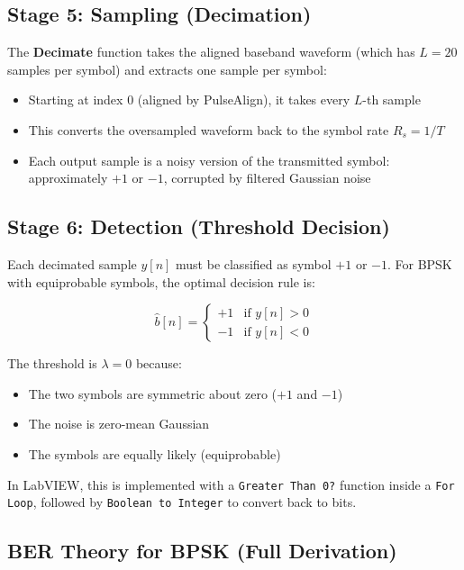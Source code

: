 \subsection{Stage 5: Sampling (Decimation)}

The \textbf{Decimate} function takes the aligned baseband waveform (which has $L = 20$ samples per symbol) and extracts one sample per symbol:

\begin{itemize}
\item Starting at index 0 (aligned by PulseAlign), it takes every $L$-th sample
\item This converts the oversampled waveform back to the symbol rate $R_s = 1/T$
\item Each output sample is a noisy version of the transmitted symbol: approximately $+1$ or $-1$, corrupted by filtered Gaussian noise
\end{itemize}

\subsection{Stage 6: Detection (Threshold Decision)}

Each decimated sample $y[n]$ must be classified as symbol $+1$ or $-1$. For BPSK with equiprobable symbols, the optimal decision rule is:

\begin{equation}
\hat{b}[n] = \begin{cases} +1 & \text{if } y[n] > 0 \\ -1 & \text{if } y[n] < 0 \end{cases}
\end{equation}

The threshold is $\lambda = 0$ because:

\begin{itemize}
\item The two symbols are symmetric about zero ($+1$ and $-1$)
\item The noise is zero-mean Gaussian
\item The symbols are equally likely (equiprobable)
\end{itemize}

In LabVIEW, this is implemented with a \texttt{Greater Than 0?} function inside a \texttt{For Loop}, followed by \texttt{Boolean to Integer} to convert back to bits.

\subsection{BER Theory for BPSK (Full Derivation)}
\label{sec:ber-theory}

